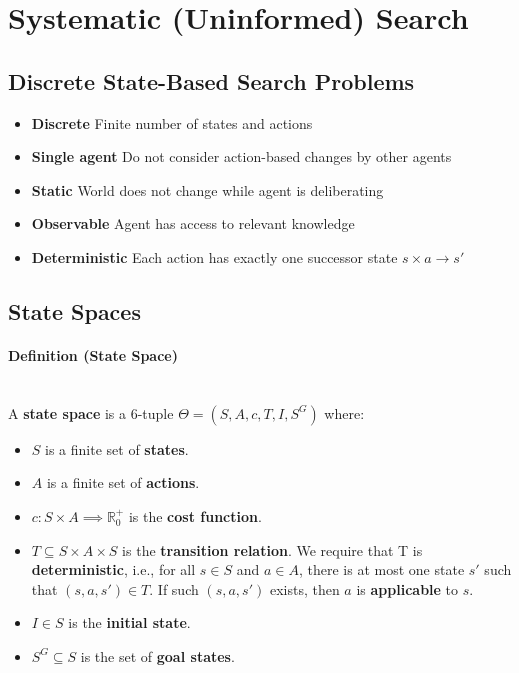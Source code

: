 \documentclass[conference, a4paper]{styles/acmsiggraph}
\newcommand\subsubsubsection{\paragraph}
\begin{document}
        
\section{Systematic (Uninformed) Search}
    
    \subsection{Discrete State-Based Search Problems}
        \begin{itemize}
            \item \textbf{Discrete}\newline
                Finite number of states and actions
            \item \textbf{Single agent}\newline
                Do not consider action-based changes by other agents
            \item \textbf{Static}\newline
                World does not change while agent is deliberating
            \item \textbf{Observable}\newline
                Agent has access to relevant knowledge
            \item \textbf{Deterministic}\newline
                Each action has exactly one successor state $s \times a \longrightarrow s'$
        \end{itemize}
    
    \subsection{State Spaces}
        \subsubsubsection{Definition (State Space)}\ \\
            A \textbf{state space} is a 6-tuple $\Theta = (S,A,c,T,I,S^G)$ where:
            \begin{itemize}
                \item $S$ is a finite set of \textbf{states}.
                \item $A$ is a finite set of \textbf{actions}.
                \item $c : S \times A \implies \mathbb{R}^+_0$ is the \textbf{cost function}.
                \item $T \subseteq S \times A \times S$ is the \textbf{transition relation}.
                    We require that T is \textbf{deterministic}, i.e., for all $s \in S$ and $a \in A$, there is at most one state $s'$ such that $(s,a,s') \in T$.
                    If such $(s,a,s')$ exists, then $a$ is \textbf{applicable} to $s$.
                \item $I \in S$ is the \textbf{initial state}.
                \item $S^G \subseteq S$ is the set of \textbf{goal states}.
            \end{itemize}
            
\end{document}
